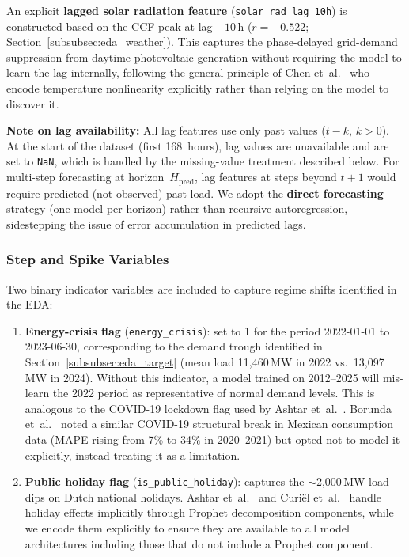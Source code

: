 An explicit \textbf{lagged solar radiation feature} (\texttt{solar\_rad\_lag\_10h}) is constructed based on the CCF peak at lag $-10$\,h ($r = -0.522$; Section~\ref{subsubsec:eda_weather}). This captures the phase-delayed grid-demand suppression from daytime photovoltaic generation without requiring the model to learn the lag internally, following the general principle of Chen et~al.~\cite{chen_monthly_2025} who encode temperature nonlinearity explicitly rather than relying on the model to discover it.

\textbf{Note on lag availability:} All lag features use only past values ($t-k$, $k > 0$). At the start of the dataset (first 168~hours), lag values are unavailable and are set to \texttt{NaN}, which is handled by the missing-value treatment described below. For multi-step forecasting at horizon~$H_{\text{pred}}$, lag features at steps beyond $t+1$ would require predicted (not observed) past load. We adopt the \textbf{direct forecasting} strategy (one model per horizon) rather than recursive autoregression, sidestepping the issue of error accumulation in predicted lags.

\subsubsection{Step and Spike Variables}
\label{subsubsec:step_spike}

Two binary indicator variables are included to capture regime shifts identified in the EDA:

\begin{enumerate}
    \item \textbf{Energy-crisis flag} (\texttt{energy\_crisis}): set to 1 for the period 2022-01-01 to 2023-06-30, corresponding to the demand trough identified in Section~\ref{subsubsec:eda_target} (mean load 11{,}460\,MW in 2022 vs.\ 13{,}097\,MW in 2024). Without this indicator, a model trained on 2012--2025 will mis-learn the 2022 period as representative of normal demand levels. This is analogous to the COVID-19 lockdown flag used by Ashtar et~al.~\cite{ashtar_hybrid_2025}. Borunda et~al.~\cite{borunda_machine_2025} noted a similar COVID-19 structural break in Mexican consumption data (MAPE rising from 7\% to 34\% in 2020--2021) but opted not to model it explicitly, instead treating it as a limitation.

    \item \textbf{Public holiday flag} (\texttt{is\_public\_holiday}): captures the $\sim$2{,}000\,MW load dips on Dutch national holidays. Ashtar et~al.~\cite{ashtar_hybrid_2025} and Curi\"el et~al.~\cite{curiel_integrating_2025} handle holiday effects implicitly through Prophet decomposition components, while we encode them explicitly to ensure they are available to all model architectures including those that do not include a Prophet component.
\end{enumerate}

